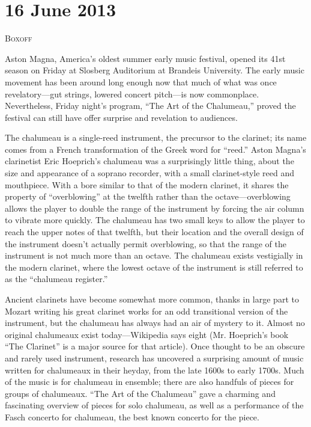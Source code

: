 \chapter{16 June 2013}

\textsc{Boxoff}

Aston Magna, America’s oldest summer early music festival, opened its 41st season on Friday at Slosberg Auditorium at Brandeis University. The early music movement has been around long enough now that much of what was once revelatory—gut strings, lowered concert pitch—is now commonplace. Nevertheless, Friday night’s program, “The Art of the Chalumeau,” proved the festival can still have offer surprise and revelation to audiences.

The chalumeau is a single-reed instrument, the precursor to the clarinet; its name comes from a French transformation of the Greek word for “reed.” Aston Magna’s clarinetist Eric Hoeprich’s chalumeau was a surprisingly little thing, about the size and appearance of a soprano recorder, with a small clarinet-style reed and mouthpiece. With a bore similar to that of the modern clarinet, it shares the property of “overblowing” at the twelfth rather than the octave—overblowing allows the player to double the range of the instrument by forcing the air column to vibrate more quickly. The chalumeau has two small keys to allow the player to reach the upper notes of that twelfth, but their location and the overall design of the instrument doesn’t actually permit overblowing, so that the range of the instrument is not much more than an octave. The chalumeau exists vestigially in the modern clarinet, where the lowest octave of the instrument is still referred to as the “chalumeau register.”

Ancient clarinets have become somewhat more common, thanks in large part to Mozart writing his great clarinet works for an odd transitional version of the instrument, but the chalumeau has always had an air of mystery to it. Almost no original chalumeaux exist today—Wikipedia says eight (Mr. Hoeprich’s book “The Clarinet” is a major source for that article). Once thought to be an obscure and rarely used instrument, research has uncovered a surprising amount of music written for chalumeaux in their heyday, from the late 1600s to early 1700s. Much of the music is for chalumeau in ensemble; there are also handfuls of pieces for groups of chalumeaux. “The Art of the Chalumeau” gave a charming and fascinating overview of pieces for solo chalumeau, as well as a performance of the Fasch concerto for chalumeau, the best known concerto for the piece.

